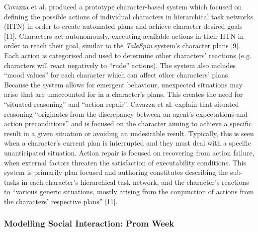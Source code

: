 \documentclass{sig-alternate-05-2015}
\begin{document}
Cavazza et al. produced a prototype character-based system which focused on defining the possible actions of individual characters in hierarchical task networks (HTN) in order to create automated plans and achieve character desired goals [11]. Characters act autonomously, executing available actions in their HTN in order to reach their goal, similar to the \textit{TaleSpin} system's character plans [9].  Each action is categorised and used to determine other characters' reactions (e.g. characters will react negatively to ``rude'' actions). The system also includes ``mood values'' for each character which can affect other characters' plans. Because the system allows for emergent behaviour, unexpected situations may arise that are unaccounted for in a character's plans. This creates the need for ``situated reasoning'' and ``action repair''. Cavazza et al. explain that situated reasoning ``originates from the discrepancy between an agent's expectations and action preconditions'' and is focused on the character aiming to achieve a specific result in a given situation or avoiding an undesirable result. Typically, this is seen when a character's current plan is interrupted and they must deal with a specific unanticipated situation. Action repair is focused on recovering from action failure, when external factors threaten the satisfaction of executability conditions. This system is primarily plan focused and authoring constitutes describing the sub-tasks in each character's hierarchical task network, and the character's reactions to ``various generic situations, mostly arising
from the conjunction of actions from the characters'
respective plans'' [11].\\ 

\subsubsection{Modelling Social Interaction: Prom Week}
\end{document}
